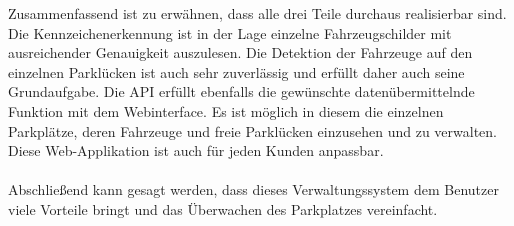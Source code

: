 Zusammenfassend ist zu erwähnen, dass alle drei Teile durchaus realisierbar sind. Die Kennzeichenerkennung ist in der Lage einzelne Fahrzeugschilder mit ausreichender Genauigkeit auszulesen. 
Die Detektion der Fahrzeuge auf den einzelnen Parklücken ist auch sehr zuverlässig und erfüllt daher auch seine Grundaufgabe. Die API erfüllt ebenfalls die gewünschte datenübermittelnde Funktion mit dem Webinterface.
Es ist möglich in diesem die einzelnen Parkplätze, deren Fahrzeuge und freie Parklücken einzusehen und zu verwalten. Diese Web-Applikation ist auch für jeden Kunden anpassbar.
\\ \\
Abschließend kann gesagt werden, dass dieses Verwaltungssystem dem Benutzer viele Vorteile bringt und das Überwachen des Parkplatzes vereinfacht.